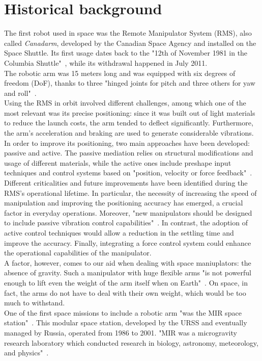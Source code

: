 \documentclass[a4paper,12pt,oneside]{report}
\begin{document}
\section{Historical background}
The first robot used in space was the Remote Manipulator System (RMS), also called \textit{Canadarm}, developed by the Canadian Space Agency and installed on the Space Shuttle. Its first usage dates back to the "12th of November 1981 in the Columbia Shuttle"~\cite{five}, while its withdrawal happened in July 2011.\\
The robotic arm was 15 meters long and was equipped with six degrees of freedom (DoF), thanks to three "hinged joints for pitch and three others for yaw and roll"~\cite{five}.\\
Using the RMS in orbit involved different challenges, among which one of the most relevant was its precise positioning: since it was built out of light materials to reduce the launch costs, the arm tended to deflect significantly. Furthermore, the arm's acceleration and braking are used to generate considerable vibrations. In order to improve its positioning, two main approaches have been developed: passive and active. The passive mediation relies on structural modifications and usage of different materials, while the active ones include preshape input techniques and control systems based on "position, velocity or force feedback"~\cite{five}.\\
Different criticalities and future improvements have been identified during the RMS's operational lifetime. In particular, the necessity of increasing the speed of manipulation and improving the positioning accuracy has emerged, a crucial factor in everyday operations. Moreover, "new manipulators should be designed to include passive vibration control capabilities"~\cite{five}. In contrast, the adoption of active control techniques would allow a reduction in the settling time and improve the accuracy. Finally, integrating a force control system could enhance the operational capabilities of the manipulator.\\
A factor, however, comes to our aid when dealing with space maniuplators: the absence of gravity. Such a manipulator with huge flexible arms "is not powerful enough to lift even the weight of the arm itself when on Earth"~\cite{six}. On space, in fact, the arms do not have to deal with their own weight, which would be too much to withstand.\\
One of the first space missions to include a robotic arm "was the MIR space station"~\cite{six}. This modular space station, developed by the URSS and eventually managed by Russia, operated from 1986 to 2001. "MIR was a microgravity research laboratory which conducted research in biology, astronomy, meteorology, and physics"~\cite{six}.\\
\end{document}
